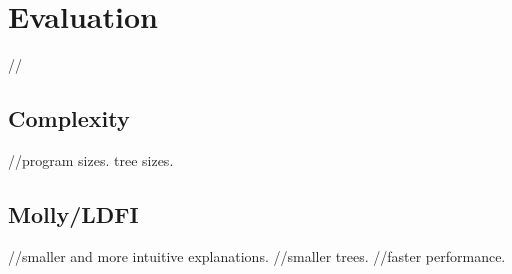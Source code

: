 
\section{Evaluation} \label{eval}
//

\subsection{Complexity}
//program sizes. tree sizes.

\subsection{Molly/LDFI}
//smaller and more intuitive explanations. //smaller trees. //faster performance.
